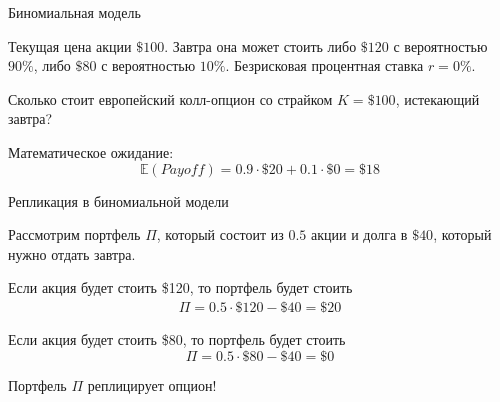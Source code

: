 \documentclass{beamer}
\begin{document}
\newcommand{\drawStockLink}[4]{

	\draw[
		->,
		>=triangle 90
	]
	(#1.east) -- (#2.west)
	node[
		pos = 0.5,
		anchor = #4
	]
	{#3};
}

\newcommand{\drawOneStepBinomialTree}{
	\drawStockNode{\$100}{?}{0}{0}{S0_node}
	\drawStockNode{\$120}{\$20}{4}{ 1}{Su_node}
	\drawStockNode{\$80}{\$0}{4}{-1}{Sd_node}
	
	\drawStockLink{S0_node}{Su_node}{$90\%$}{south east}	
	\drawStockLink{S0_node}{Sd_node}{$10\%$}{north east}
}

\begin{frame}{Биномиальная модель}
\centering
{}

\justify
Текущая цена акции $\$100$. Завтра она может стоить либо $\$120$ с вероятностью $90\%$, либо $\$80$ с вероятностью $10\%$. Безрисковая процентная ставка $r=0\%$.

\justify
Сколько стоит европейский колл-опцион со страйком $K=\$100$, истекающий завтра?

\justify
Математическое ожидание:
$$\mathbb{E}(Payoff) = 0.9\cdot \$20 + 0.1\cdot \$0 = \$18 $$
\end{frame}



\begin{frame}{Репликация в биномиальной модели}
\centering
{}

\justify
Рассмотрим портфель $\Pi$, который состоит из $0.5$ акции и долга в $\$40$, который нужно отдать завтра.

\justify
Если акция будет стоить \$120, то портфель будет стоить
\begin{align*}\Pi = 0.5\cdot\$120 - \$40 = \$20\end{align*}

\justify
Если акция будет стоить \$80, то портфель будет стоить
$$\Pi = 0.5 \cdot \$80 - \$40 = \$0$$

\justify
Портфель $\Pi$ \alert{реплицирует} опцион!
\end{frame}
\end{document}
